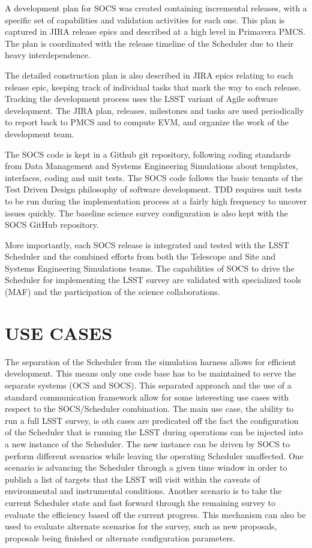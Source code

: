 \documentclass[]{spie}  %
\begin{document}
A development plan for SOCS was created containing incremental releases, with a specific set of capabilities and validation activities for each one. This plan is captured in JIRA\cite{JIRA} release epics and described at a high level in Primavera PMCS. The plan is coordinated with the release timeline of the Scheduler due to their heavy interdependence.

The detailed construction plan is also described in JIRA epics relating to each release epic, keeping track of individual tasks that mark the way to each release. Tracking the development process uses the LSST variant of Agile software development\cite{Kantor_SPIE2016}. The JIRA plan, releases, milestones and tasks are used periodically to report back to PMCS and to compute EVM, and organize the work of the development team.

The SOCS code is kept in a Github\cite{GitHub} git repository, following coding standards from Data Management and Systems Engineering Simulations about templates, interfaces, coding and unit tests. The SOCS code follows the basic tenants of the Test Driven Design philosophy of software development. TDD requires unit tests to be run during the implementation process at a fairly high frequency to uncover issues quickly. The baseline science survey configuration is also kept with the SOCS GitHub repository. 

More importantly, each SOCS release is integrated and tested with the LSST Scheduler and the combined efforts from both the Telescope and Site and Systems Engineering Simulations teams. The capabilities of SOCS to drive the Scheduler for implementing the LSST survey are validated with specialized tools (MAF) and the participation of the science collaborations.

\section{USE CASES}

The separation of the Scheduler from the simulation harness allows for efficient development. This means only one code base has to be maintained to serve the separate systems (OCS and SOCS). This separated approach and the use of a standard communication framework allow for some interesting use cases with respect to the SOCS/Scheduler combination. The main use case, the ability to run a full LSST survey, is oth cases are predicated off the fact the configuration of the Scheduler that is running the LSST during operations can be injected into a new instance of the Scheduler. The new instance can be driven by SOCS to perform different scenarios while leaving the operating Scheduler unaffected. One scenario is advancing the Scheduler through a given time window in order to publish a list of targets that the LSST will visit within the caveats of environmental and instrumental conditions. Another scenario is to take the current Scheduler state and fast forward through the remaining survey to evaluate the efficiency based off the current progress. This mechanism can also be used to evaluate alternate scenarios for the survey, such as new proposals, proposals being finished or alternate configuration parameters.
\end{document}
